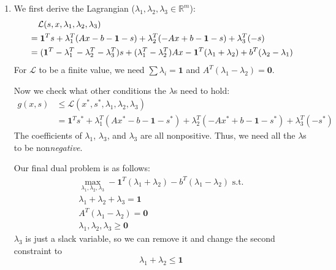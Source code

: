 \documentclass[12pt]{article}
\begin{document}
\begin{enumerate}
            \pagebreak

      \item We first derive the Lagrangian ($\lambda_1, \lambda_2, \lambda_3 \in \mathbb{R}^m$):
            \begin{align*}
                   & \hphantom{={}} \mathcal{L}(s, x, \lambda_1, \lambda_2, \lambda_3)                                                                            \\
                   & = \mathbf{1}^Ts+\lambda_1^T(Ax-b-\mathbf{1}-s)+\lambda_2^T(-Ax+b-\mathbf{1}-s)+\lambda_3^T(-s)                                               \\
                   & = (\mathbf{1}^T-\lambda_1^T-\lambda_2^T-\lambda_3^T)s+(\lambda_1^T-\lambda_2^T)Ax-\mathbf{1}^T(\lambda_1+\lambda_2)+b^T(\lambda_2-\lambda_1)
            \end{align*}
            For $\mathcal{L}$ to be a finite value,
            we need $\sum \lambda_i = \mathbf{1}$ and $A^T(\lambda_1-\lambda_2)=\mathbf{0}$.

            Now we check what other conditions the $\lambda$s need to hold:
            \begin{align*}
                  g(x, s) & \le \mathcal{L}(x^*, s^*, \lambda_1, \lambda_2, \lambda_3)                                                \\
                          & =\mathbf{1}^Ts^*+\lambda_1^T(Ax^*-b-\mathbf{1}-s^*)+\lambda_2^T(-Ax^*+b-\mathbf{1}-s^*)+\lambda_3^T(-s^*)
            \end{align*}
            The coefficients of $\lambda_1$, $\lambda_3$, and $\lambda_3$ are all nonpositive.
            Thus, we need all the $\lambda$s to be non\textit{negative}.

            Our final dual problem is as follows:
            \begin{gather*}
                  \max_{\lambda_1, \lambda_2, \lambda_3} -\mathbf{1}^T(\lambda_1+\lambda_2)-b^T(\lambda_1-\lambda_2)\text{ s.t.} \\
                  \lambda_1+\lambda_2+\lambda_3=\mathbf{1} \\
                  A^T(\lambda_1-\lambda_2)=\mathbf{0} \\
                  \lambda_1, \lambda_2, \lambda_3 \ge \mathbf{0}
            \end{gather*}
            $\lambda_3$ is just a slack variable, so we can remove it
            and change the second constraint to \[\lambda_1+\lambda_2 \le \mathbf{1}\]


\end{enumerate}
\end{document}
